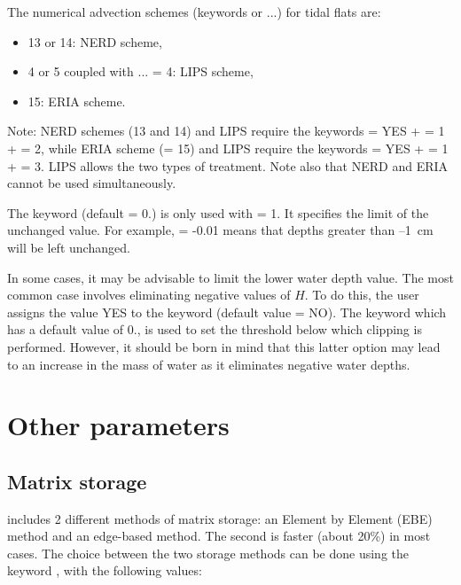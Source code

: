 The numerical advection schemes (keywords 
or ...) for tidal flats are:
\begin{itemize}
\item 13 or 14: NERD scheme,
\item 4 or 5 coupled with ... = 4:
LIPS scheme,
\item 15: ERIA scheme.
\end{itemize}

\begin{WarningBlock}{Note:}
NERD schemes (13 and 14) and LIPS require the keywords
   = YES
+  = 1
+  = 2,
while ERIA scheme (= 15) and LIPS require the keywords
   = YES
+  = 1
+  = 3.
LIPS allows the two types of treatment.
Note also that NERD and ERIA cannot be used simultaneously.
\end{WarningBlock}

The keyword  (default = 0.)
is only used with  = 1.
It specifies the limit of the unchanged value.
For example,  = -0.01 means
that depths greater than --1~cm will be left unchanged.

In some cases, it may be advisable to limit the lower water depth value.
The most common case involves eliminating negative values of $H$.
To do this, the user assigns the value YES to the keyword 
(default value = NO).
The keyword  which has a default value of 0.,
is used to set the threshold below which clipping is performed.
However, it should be born in mind that this latter option may lead
to an increase in the mass of water as it eliminates negative water depths.

\section{Other parameters}

\subsection{Matrix storage}

 includes 2 different methods of matrix storage:
an Element by Element (EBE) method and an edge-based method.
The second is faster (about 20\%) in most cases.
The choice between the two storage methods can be done using the keyword
, with the following values:

